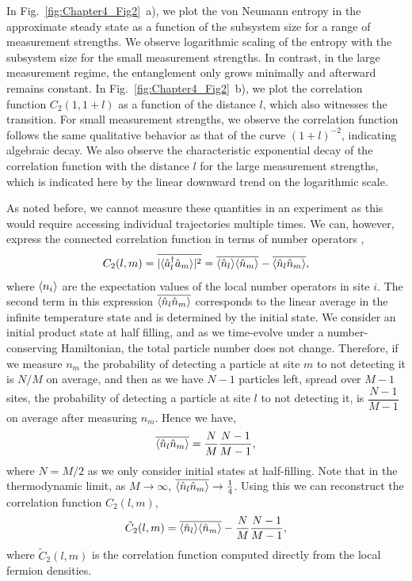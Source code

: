 In Fig.~\ref{fig:Chapter4_Fig2}~a), we plot the von Neumann entropy in the approximate steady state as a function of the subsystem size for a range of measurement strengths. We observe logarithmic scaling of the entropy with the subsystem size for the small measurement strengths. In contrast, in the large measurement regime, the entanglement only grows minimally and afterward remains constant. In Fig.~\ref{fig:Chapter4_Fig2}~b), we plot the correlation function $C_2(1,1+l)$ as a function of the distance $l$, which also witnesses the transition. For small measurement strengths, we observe the correlation function follows the same qualitative behavior as that of the curve $(1+l)^{-2}$, indicating algebraic decay. We also observe the characteristic exponential decay of the correlation function with the distance $l$ for the large measurement strengths, which is indicated here by the linear downward trend on the logarithmic scale.

As noted before, we cannot measure these quantities in an experiment as this would require accessing individual trajectories multiple times. We can, however, express the connected correlation function in terms of number operators \cite{alberton2021}, 
\begin{equation}
    C_2(l,m) = \overline{|\langle \hat{a}^\dagger_l \hat{a}_{m} \rangle|^2} = \overline{\langle\hat{n}_l\rangle \langle\hat{n}_m\rangle} - \overline{\langle\hat{n}_l \hat{n}_m\rangle},
\end{equation}
where $\langle n_i\rangle$ are the expectation values of the local number operators in site $i$. The second term in this expression $\overline{\langle\hat{n}_l \hat{n}_m\rangle}$ corresponds to the linear average in the infinite temperature state and is determined by the initial state. We consider an initial product state at half filling, and as we time-evolve under a number-conserving Hamiltonian, the total particle number does not change. 
Therefore, if we measure $n_m$ the probability of detecting a particle at site $m$ to not detecting it is $N/M$ on average, and then as we have $N-1$ particles left, spread over $M-1$ sites, the probability of detecting a particle at site $l$ to not detecting it, is $\dfrac{N-1}{M-1}$ on average after measuring $n_m$. Hence we have, 
\begin{equation}
    \overline{\langle\hat{n}_l \hat{n}_m\rangle} = \frac{N}{M}\frac{N-1}{M-1},
\end{equation}
where $N = M/2$ as we only consider initial states at half-filling. Note that in the thermodynamic limit, as $M\to\infty$, $\overline{\langle\hat{n}_l \hat{n}_m\rangle} \to \frac{1}{4}$. Using this we can reconstruct the correlation function $C_2(l,m)$, 
\begin{equation}
   \tilde C_2(l,m) = \overline{\langle\hat{n}_l\rangle \langle\hat{n}_m\rangle} - \frac{N}{M}\frac{N-1}{M-1},
\end{equation}
where $\tilde C_2(l,m)$ is the correlation function computed directly from the local fermion densities. 

